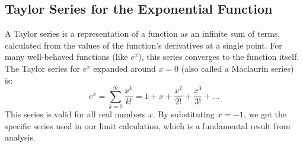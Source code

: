 \documentclass[11pt,a4paper]{article}
\begin{document}
\subsection{Taylor Series for the Exponential Function \label{note:taylor}}
A Taylor series is a representation of a function as an infinite sum of terms, calculated from the values of the function's derivatives at a single point. For many well-behaved functions (like $e^x$), this series converges to the function itself. The Taylor series for $e^x$ expanded around $x=0$ (also called a Maclaurin series) is:
\[ e^x = \sum_{k=0}^\infty \frac{x^k}{k!} = 1 + x + \frac{x^2}{2!} + \frac{x^3}{3!} + \dots \]
This series is valid for all real numbers $x$. By substituting $x=-1$, we get the specific series used in our limit calculation, which is a fundamental result from analysis.
\end{document}

